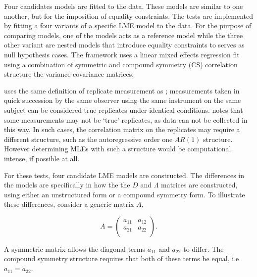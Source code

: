 \documentclass[12pt, a4paper]{report}
\theoremstyle{plain}
\theoremstyle{definition}
\theoremstyle{remark}
\begin{document}
	
	
	Four candidates models are fitted to the data. These models are similar to one another, but for the imposition of equality constraints. The tests are implemented by fitting a four variants of a specific LME model to the data. For the purpose of comparing models, one of the models acts as a reference model while the three other variant are nested models that introduce equality constraints to serves as null hypothesis cases. The framework uses a linear mixed effects regression fit using a combination of symmetric and compound symmetry (CS) correlation structure the variance covariance matrices.	
	
	\citet{ARoy2009} uses the same definition of replicate measurement as \citet{BA99}; measurements taken in quick succession by the same observer using the same instrument on the same subject can be considered true replicates under identical conditions. \citet{ARoy2009} notes that some measurements may not be `true' replicates, as data can not be collected in this way. In such cases, the correlation matrix on the replicates may require a different structure, such as the autoregressive order one $AR(1)$ structure. However determining MLEs with such a structure would be computational intense, if possible at all.
	
	For these tests, four candidate LME models are constructed. The differences in the models are specifically in how the the $D$ and $\Lambda$ matrices are constructed, using either an unstructured form or a compound symmetry form. To illustrate these differences, consider a generic matrix $A$,
	
	\[
	{A} = \left( \begin{array}{cc}
	a_{11} & a_{12}  \\
	a_{21} & a_{22}  \\
	\end{array}\right).
	\]
	
	A symmetric matrix allows the diagonal terms $a_{11}$ and $a_{22}$ to differ. The compound symmetry structure requires that both of these terms be equal, i.e $a_{11} = a_{22}$.
	
\end{document}
